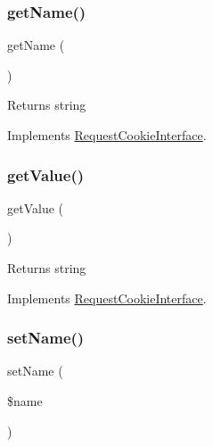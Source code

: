\subsubsection{\texorpdfstring{get\+Name()}{getName()}}
{\footnotesize\ttfamily get\+Name (\begin{DoxyParamCaption}{ }\end{DoxyParamCaption})}

\begin{DoxyReturn}{Returns}
string 
\end{DoxyReturn}


Implements \mbox{\hyperlink{interface_pes_1_1_http_1_1_cookies_1_1_request_cookie_interface}{Request\+Cookie\+Interface}}.

\mbox{\label{class_pes_1_1_http_1_1_cookies_1_1_request_cookie_ac0bc18784b182c89fcfd276625aef435}} 
\subsubsection{\texorpdfstring{get\+Value()}{getValue()}}
{\footnotesize\ttfamily get\+Value (\begin{DoxyParamCaption}{ }\end{DoxyParamCaption})}

\begin{DoxyReturn}{Returns}
string 
\end{DoxyReturn}


Implements \mbox{\hyperlink{interface_pes_1_1_http_1_1_cookies_1_1_request_cookie_interface}{Request\+Cookie\+Interface}}.

\mbox{\label{class_pes_1_1_http_1_1_cookies_1_1_request_cookie_a2fe666694997d047711d7653eca2f132}} 
\subsubsection{\texorpdfstring{set\+Name()}{setName()}}
{\footnotesize\ttfamily set\+Name (\begin{DoxyParamCaption}\item[{}]{\$name }\end{DoxyParamCaption})}


